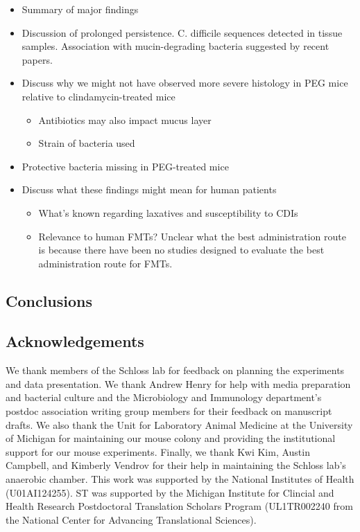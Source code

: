 \documentclass[
  11pt,
]{article}
\providecommand{\tightlist}{%
  \setlength{\itemsep}{0pt}\setlength{\parskip}{0pt}}
\begin{document}
\begin{itemize}
\item
  Summary of major findings
\item
  Discussion of prolonged persistence. C. difficile sequences detected
  in tissue samples. Association with mucin-degrading bacteria suggested
  by recent papers.
\item
  Discuss why we might not have observed more severe histology in PEG
  mice relative to clindamycin-treated mice

  \begin{itemize}
  \tightlist
  \item
    Antibiotics may also impact mucus layer
  \item
    Strain of bacteria used
  \end{itemize}
\item
  Protective bacteria missing in PEG-treated mice
\item
  Discuss what these findings might mean for human patients

  \begin{itemize}
  \tightlist
  \item
    What's known regarding laxatives and susceptibility to CDIs
  \item
    Relevance to human FMTs? Unclear what the best administration route
    is because there have been no studies designed to evaluate the best
    administration route for FMTs.
  \end{itemize}
\end{itemize}

\hypertarget{conclusions}{%
\subsection{Conclusions}\label{conclusions}}

\hypertarget{acknowledgements}{%
\subsection{Acknowledgements}\label{acknowledgements}}

We thank members of the Schloss lab for feedback on planning the
experiments and data presentation. We thank Andrew Henry for help with
media preparation and bacterial culture and the Microbiology and
Immunology department's postdoc association writing group members for
their feedback on manuscript drafts. We also thank the Unit for
Laboratory Animal Medicine at the University of Michigan for maintaining
our mouse colony and providing the institutional support for our mouse
experiments. Finally, we thank Kwi Kim, Austin Campbell, and Kimberly
Vendrov for their help in maintaining the Schloss lab's anaerobic
chamber. This work was supported by the National Institutes of Health
(U01AI124255). ST was supported by the Michigan Institute for Clincial
and Health Research Postdoctoral Translation Scholars Program
(UL1TR002240 from the National Center for Advancing Translational
Sciences).
\end{document}
